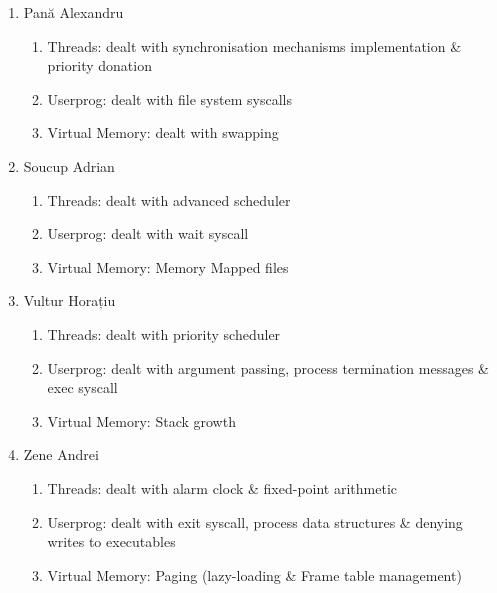 \documentclass[a4paper,12pt]{report}
\begin{document}
\begin{enumerate}
	\item Pană Alexandru
	    \begin{enumerate}
	     \item Threads: dealt with synchronisation mechanisms implementation \& priority donation
	     \item Userprog: dealt with file system syscalls
	     \item Virtual Memory: dealt with swapping
	    \end{enumerate}

	\item Soucup Adrian
	    \begin{enumerate}
	     \item Threads: dealt with advanced scheduler
	     \item Userprog: dealt with wait syscall
	     \item Virtual Memory: Memory Mapped files
	    \end{enumerate}
	    
	\item Vultur Horațiu
	    \begin{enumerate}
	     \item Threads: dealt with priority scheduler
	     \item Userprog: dealt with argument passing, process termination messages \& exec syscall
	     \item Virtual Memory: Stack growth
	    \end{enumerate}

	\item Zene Andrei
	    \begin{enumerate}
	     \item Threads: dealt with alarm clock \& fixed-point arithmetic
	     \item Userprog: dealt with exit syscall, process data structures \& denying writes to executables
	     \item Virtual Memory: Paging (lazy-loading \& Frame table management)
	    \end{enumerate}
	   
\end{enumerate}











\end{document}
